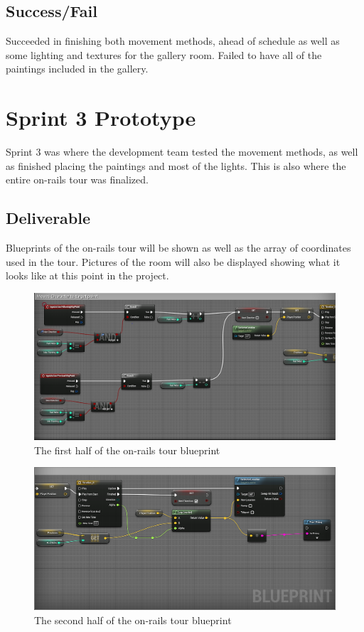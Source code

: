 \subsection{Success/Fail}
Succeeded in finishing both movement methods, ahead of schedule as well as some lighting and textures for the gallery room.  Failed to have all of the paintings included in the gallery.

\section{Sprint 3 Prototype}
Sprint 3 was where the development team tested the movement methods, as well as finished placing the paintings and most of the lights.  This is also where the entire on-rails tour was finalized.
\subsection{Deliverable}
Blueprints of the on-rails tour will be shown as well as the array of coordinates used in the tour.  Pictures of the room will also be displayed showing what it looks like at this point in the project.

\begin{figure}
	\caption{The first half of the on-rails tour blueprint}
	\centering
	\includegraphics[scale=0.5]{SprintReports/Sprint3/WayMove1.png}
\end{figure}

\begin{figure}
	\caption{The second half of the on-rails tour blueprint}
	\centering
	\includegraphics[scale=0.5]{SprintReports/Sprint3/WayMove2.png}
\end{figure}

